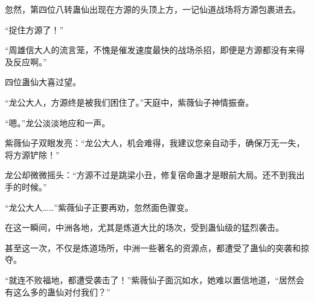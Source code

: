 \begin{this_body}
忽然，第四位八转蛊仙出现在方源的头顶上方，一记仙道战场将方源包裹进去。

“捉住方源了！”

“周雄信大人的流言笼，不愧是催发速度最快的战场杀招，即便是方源都没有来得及反应啊。”

四位蛊仙大喜过望。

“龙公大人，方源终是被我们困住了。”天庭中，紫薇仙子神情振奋。

“嗯。”龙公淡淡地应和一声。

紫薇仙子双眼发亮：“龙公大人，机会难得，我建议您亲自动手，确保万无一失，将方源铲除！”

龙公却微微摇头：“方源不过是跳梁小丑，修复宿命蛊才是眼前大局。还不到我出手的时候。”

“龙公大人……”紫薇仙子正要再劝，忽然面色骤变。

在这一瞬间，中洲各地，尤其是炼道大比的场次，受到蛊仙级的猛烈袭击。

甚至这一次，不仅是炼道场所，中洲一些著名的资源点，都遭受了蛊仙的突袭和掠夺。

“就连不败福地，都遭受袭击了！”紫薇仙子面沉如水，她难以置信地道，“居然会有这么多的蛊仙对付我们？”

\end{this_body}

